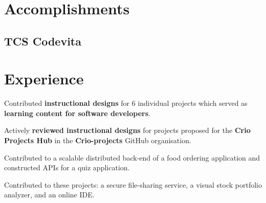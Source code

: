 \documentclass[]{deedy-resume-openfont}
\begin{document}
\begin{minipage}[t]{0.33\textwidth}
\section{Accomplishments} 
\sectionsep
\subsection{TCS Codevita}
\sectionsep

%
%

\end{minipage} 
\hfill
\begin{minipage}[t]{0.66\textwidth} 


\section{Experience}

\sectionsep
\begin{tightemize}
\item Contributed \textbf{instructional designs} for 6 individual projects which served as \textbf{learning content for software developers}.
\item Actively \textbf{reviewed instructional designs} for projects proposed for the \textbf{Crio Projects Hub} in the \textbf{Crio-projects} GitHub organisation.
\end{tightemize}

\begin{tightemize}
\item Contributed to a scalable distributed back-end of a food ordering application and constructed APIs for a quiz application.\\
\end{tightemize}

\begin{tightemize}
\item Contributed to these projects: a secure file-sharing service, a visual stock portfolio analyzer, and an online IDE.\\
\end{tightemize}


\end{minipage}
\end{document}
